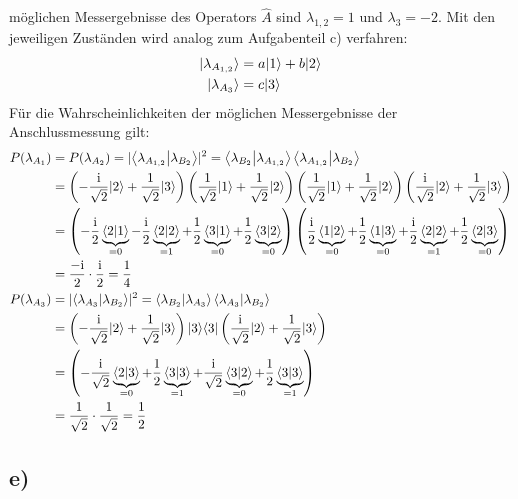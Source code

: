     \justifying möglichen Messergebnisse des Operators $\hat{A}$ sind $\lambda_{1,2}=1$ und $\lambda_3=-2$. Mit den jeweiligen
    Zuständen wird analog zum Aufgabenteil c) verfahren:
    \begin{align*}
    \lvert\lambda_{A_{1,2}}\rangle &= a\lvert1\rangle+b\lvert2\rangle\\
    \lvert\lambda_{A_3}\rangle &= c\lvert3\rangle
    \end{align*}
    Für die Wahrscheinlichkeiten der möglichen Messergebnisse der Anschlussmessung gilt: 
    \begin{align*}
    P(\lambda_{A_1}) &= P(\lambda_{A_2}) = \lvert\braket{\lambda_{A_{1,2}}}{\lambda_{B_2}}\rvert^2 =\braket{\lambda_{B_2}}{\lambda_{A_{1,2}}}\braket{\lambda_{A_{1,2}}}{\lambda_{B_2}}\\
    &= \left( -\frac{\text{i}}{\sqrt{2}}\lvert2\rangle+\frac{1}{\sqrt{2}}\lvert3\rangle \right) \left( \frac{1}{\sqrt{2}} \lvert1\rangle+\frac{1}{\sqrt{2}}\lvert2\rangle \right)
    \left( \frac{1}{\sqrt{2}}\lvert1\rangle+\frac{1}{\sqrt{2}}\lvert2\rangle \right) \left( \frac{\text{i}}{\sqrt{2}} \lvert2\rangle+\frac{1}{\sqrt{2}}\lvert3\rangle \right)\\
    &= \left( -\frac{\text{i}}{2} \underbrace{\braket{2}{1}}_{=0} - \frac{\text{i}}{2} \underbrace{\braket{2}{2}}_{=1} + 
    \frac{1}{2} \underbrace{\braket{3}{1}}_{=0} + \frac{1}{2} \underbrace{\braket{3}{2}}_{=0} \right)
    \left( \frac{\text{i}}{2} \underbrace{\braket{1}{2}}_{=0} + \frac{1}{2} \underbrace{\braket{1}{3}}_{=0} + 
    \frac{\text{i}}{2} \underbrace{\braket{2}{2}}_{=1} + \frac{1}{2} \underbrace{\braket{2}{3}}_{=0} \right)\\
    &= \frac{-\text{i}}{2} \cdot \frac{\text{i}}{2} = \frac{1}{4}\\
    P(\lambda_{A_3}) &= \lvert\braket{\lambda_{A_3}}{\lambda_{B_2}}\rvert^2 =\braket{\lambda_{B_2}}{\lambda_{A_3}}\braket{\lambda_{A_3}}{\lambda_{B_2}}\\
    &= \left( -\frac{\text{i}}{\sqrt{2}}\lvert2\rangle+\frac{1}{\sqrt{2}}\lvert3\rangle \right) \lvert3\rangle
    \langle3\rvert \left( \frac{\text{i}}{\sqrt{2}} \lvert2\rangle+\frac{1}{\sqrt{2}}\lvert3\rangle \right)\\
    &= \left( -\frac{\text{i}}{\sqrt{2}} \underbrace{\braket{2}{3}}_{=0} + \frac{1}{2} \underbrace{\braket{3}{3}}_{=1} + 
    \frac{\text{i}}{\sqrt{2}} \underbrace{\braket{3}{2}}_{=0} + \frac{1}{2} \underbrace{\braket{3}{3}}_{=1} \right)\\
    &= \frac{1}{\sqrt{2}} \cdot \frac{1}{\sqrt{2}} = \frac{1}{2}
    \end{align*}

    \subsection{e)}

